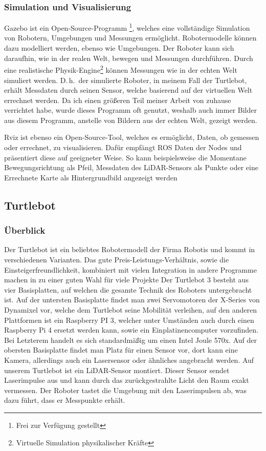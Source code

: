 {{		\subsubsection{Simulation und Visualisierung}
		{
			Gazebo ist ein Open-Source-Programm \footnote{Frei zur Verfügung gestellt}, welches eine vollständige Simulation von Robotern, Umgebungen und Messungen ermöglicht. Robotermodelle können dazu modelliert werden, ebenso wie Umgebungen. Der Roboter kann sich daraufhin, wie in der realen Welt, bewegen und Messungen durchführen. Durch eine realistische Physik-Engine\footnote{Virtuelle Simulation physikalischer Kräfte} können Messungen wie in der echten Welt simuliert werden. D.\,h.\ der simulierte Roboter, in meinem Fall der Turtlebot, erhält Messdaten durch seinen Sensor, welche basierend auf der virtuellen Welt errechnet werden. Da ich einen größeren Teil meiner Arbeit von zuhause verrichtet habe, wurde dieses Programm oft genutzt, weshalb auch immer Bilder aus diesem Programm, anstelle von Bildern aus der echten Welt, gezeigt werden.
			
			Rviz ist ebenso ein Open-Source-Tool, welches es ermöglicht, Daten, ob gemessen oder errechnet, zu visualisieren. Dafür empfängt ROS Daten der Nodes und präsentiert diese auf geeigneter Weise. So kann beispielsweise die Momentane Bewegungsrichtung als Pfeil, Messdaten des LiDAR-Sensors als Punkte oder eine Errechnete Karte als Hintergrundbild angezeigt werden
			
			
		}
	}
	\subsection{Turtlebot}
	{
		\subsubsection{Überblick}
		{
			Der Turtlebot ist ein beliebtes Robotermodell der Firma Robotis und kommt in verschiedenen Varianten. Das gute Preis-Leistungs-Verhältnis, sowie die Einsteigerfreundlichkeit, kombiniert mit vielen Integration in andere Programme machen in zu einer guten Wahl für viele Projekte
			Der Turtlebot 3 besteht aus vier Basisplatten, auf welchen die gesamte Technik des Roboters untergebracht ist. Auf der untersten Basisplatte findet man zwei Servomotoren der X-Series von Dynamixel vor, welche dem Turtlebot seine Mobilität verleihen, auf den anderen Plattformen ist ein Raspberry PI 3, welcher unter Umständen auch durch einen Raspberry Pi 4 ersetzt werden kann, sowie ein Einplatinencomputer vorzufinden. Bei Letzterem handelt es sich standardmäßig um einen Intel Joule 570x. Auf der obersten Basisplatte findet man Platz für einen Sensor vor, dort kann eine Kamera, allerdings auch ein Lasersensor oder ähnliches angebracht werden. Auf unserem Turtlebot ist ein LiDAR-Sensor montiert. Dieser Sensor sendet Laserimpulse aus und kann durch das zurückgestrahlte Licht den Raum exakt vermessen. Der Roboter tastet die Umgebung mit den Laserimpulsen ab, was dazu führt, dass er Messpunkte erhält. 
			
}}}
